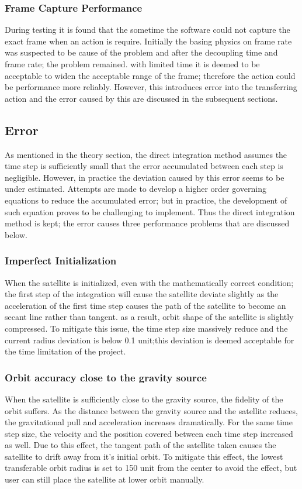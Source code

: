 \documentclass[12pt, letter]{article}
\begin{document}
\subsubsection{Frame Capture Performance}
During testing it is found that the sometime the software could not capture the exact frame when an action is require. Initially the basing physics on frame rate was suspected to be cause of the problem and after the decoupling time and frame rate; the problem remained. with limited time it is deemed to be acceptable to widen the acceptable range of the frame; therefore the action could be performance more reliably. However, this introduces error into the transferring action and the error caused by this are discussed in the subsequent sections.


\subsection{Error}

As mentioned in the theory section, the direct integration method assumes the time step is sufficiently small that the error accumulated between each step is negligible. However, in practice the deviation caused by this error seems to be under estimated. Attempts are made to develop a higher order governing equations to reduce the accumulated error; but in practice, the development of such equation proves to be challenging to implement. Thus the direct integration method is kept; the error causes three performance problems that are discussed below.

\subsubsection{Imperfect Initialization}
    When the satellite is initialized, even with the mathematically correct condition; the first step of the integration will cause the satellite deviate slightly as the acceleration of the first time step causes the path of the satellite to become an secant line rather than tangent. as a result, orbit shape of the satellite is slightly compressed. To mitigate this issue, the time step size massively reduce and the current radius deviation is below 0.1 unit;this deviation is deemed acceptable for the time limitation of the project.

\subsubsection{Orbit accuracy close to the gravity source}
    When the satellite is sufficiently close to the gravity source, the fidelity of the orbit suffers. As the distance between the gravity source and the satellite reduces, the gravitational pull and acceleration increases dramatically. For the same time step size, the velocity and the position covered between each time step increased as well. Due to this effect, the tangent path of the satellite taken causes the satellite to drift away from it's initial orbit. To mitigate this effect, the lowest transferable orbit radius is set to 150 unit from the center to avoid the effect, but user can still place the satellite at lower orbit manually.
\end{document}
